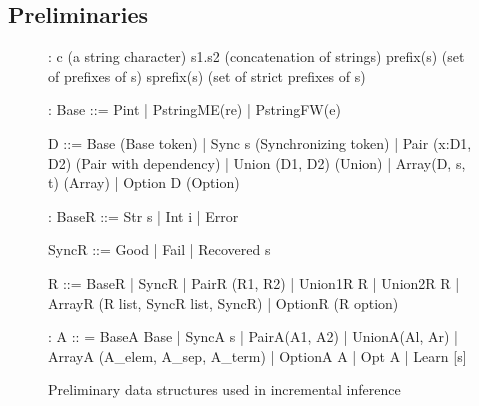 
\subsection{Preliminaries}

\begin{figure}[t]
{\small 
\begin{code}
:
c          (a string character)	
s1.s2      (concatenation of strings)
prefix(s)  (set of prefixes of s)
sprefix(s) (set of strict prefixes of s)
\end{code}
\begin{code}
:
Base ::= Pint | PstringME(re) | PstringFW(e)
\end{code}
\begin{code}
D ::=   
  Base               (Base token)
| Sync s             (Synchronizing token) 
| Pair (x:D1, D2)    (Pair with dependency)
| Union (D1, D2)     (Union)
| Array(D, s, t)     (Array)
| Option D           (Option)
\end{code}
\begin{code}
:
BaseR ::= Str s | Int i | Error
\end{code}
\begin{code}
SyncR ::= Good | Fail | Recovered s 
\end{code}
\begin{code}
R ::=
  BaseR
| SyncR
| PairR (R1, R2)
| Union1R R | Union2R R 
| ArrayR (R list, SyncR list, SyncR)
| OptionR (R option)
\end{code}
\begin{code}
:
A :: = 
  BaseA Base
| SyncA s
| PairA(A1, A2)
| UnionA(Al, Ar)
| ArrayA (A_elem, A_sep, A_term)
| OptionA A
| Opt A
| Learn [s]
\end{code}
}
\caption{Preliminary data structures used in incremental inference}
\label{fig:data-structures}
\end{figure}

